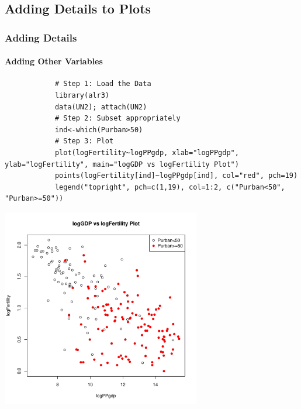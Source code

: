 \subsection{Adding Details to Plots}
\begin{frame}
  \frametitle{Adding Details}
  \framesubtitle{Adding Other Variables}
  	      
      		\begin{lstlisting}
			# Step 1: Load the Data
			library(alr3)
			data(UN2); attach(UN2)
			# Step 2: Subset appropriately
			ind<-which(Purban>50)
			# Step 3: Plot		
			plot(logFertility~logPPgdp, xlab="logPPgdp", ylab="logFertility", main="logGDP vs logFertility Plot")
			points(logFertility[ind]~logPPgdp[ind], col="red", pch=19)
			legend("topright", pch=c(1,19), col=1:2, c("Purban<50", "Purban>=50"))
		\end{lstlisting}
%
\newpage
       \begin{center}
         \includegraphics[width=0.65\textwidth]{images/Unplot3.pdf}
        \end{center}

\end{frame}

